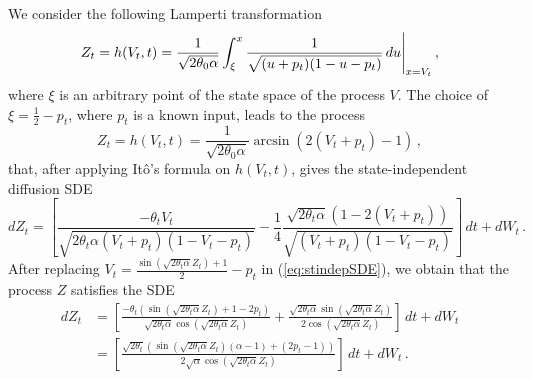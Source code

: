 \documentclass[11pt]{article}
\theoremstyle{definition}
\begin{document}
We consider the following Lamperti transformation  
\begin{equation}
Z_t = h(V_t, t) = \frac{1}{\sqrt{2 \theta_0 \alpha}} \int_{\xi}^{x} \frac{1}{\sqrt{(u + p_t)(1 - u - p_t)}} \,du \Bigg{\vert}_{x = V_t} \,,
\end{equation}
where $\xi$ is an arbitrary point of the state space of the process $V$. The choice of $\xi = \frac{1}{2} - p_t$, where $p_t$ is a known input, leads to the process 
\begin{equation}
Z_t = h(V_t, t) = \frac{1}{\sqrt{2 \theta_0 \alpha}} \arcsin (2(V_t + p_t) -1)\,,
\end{equation}
that, after applying It\^{o}'s formula on $h(V_t, t)$, gives the state-independent diffusion SDE
\begin{equation}
dZ_t = \left[  \frac{- \theta_t V_t}{ \sqrt{2 \theta_t \alpha (V_t + p_t)(1 - V_t - p_t)}} - \frac{1}{4} \frac{\sqrt{2 \theta_t \alpha} \left( 1 - 2 (V_t + p_t)\right)}{\sqrt{(V_t + p_t)(1 - V_t - p_t)}}  \right] \,dt + dW_t \,. \label{eq:stindepSDE}
\end{equation}
After replacing $V_t = \frac{\sin(\sqrt{2 \theta_t \alpha} Z_t) + 1}{2} - p_t$ in (\ref{eq:stindepSDE}), we obtain that the  process $Z$ satisfies the SDE
\begin{align}
dZ_t & = \left[ \frac{- \theta_t (\sin(\sqrt{2 \theta_t \alpha} Z_t) + 1 - 2 p_t)}{\sqrt{2 \theta_t \alpha} \cos{(\sqrt{2 \theta_t \alpha} Z_t)}} + \frac{\sqrt{2 \theta_t \alpha} \sin{(\sqrt{2 \theta_t \alpha} Z_t)}}{2 \cos{(\sqrt{2 \theta_t \alpha} Z_t)}} \right] \,dt + dW_t \nonumber \\
&  = \left[  \frac{\sqrt{2 \theta_t} \left( \sin(\sqrt{2 \theta_t \alpha} Z_t) (\alpha - 1) + (2 p_t -1 ) \right)}{2 \sqrt{\alpha} \cos{(\sqrt{2 \theta_t \alpha} Z_t)}}  \right] \,dt + dW_t \,. 
\end{align}


\end{document}
